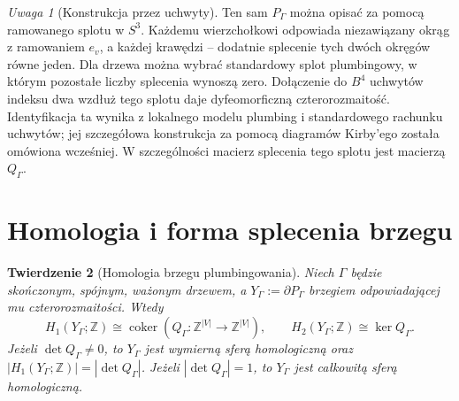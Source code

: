 \documentclass[11pt,a4paper]{report}
\numberwithin{equation}{section}
\theoremstyle{plain}
\newtheorem{twierdzenie}{Twierdzenie}[section]
\theoremstyle{definition}
\theoremstyle{remark}
\newtheorem{uwaga}[twierdzenie]{Uwaga}
\begin{document}
\begin{center}
\end{center}

\begin{uwaga}[Konstrukcja przez uchwyty]
Ten sam $P_\Gamma$ można opisać za pomocą ramowanego splotu
w $S^3$. Każdemu wierzchołkowi odpowiada niezawiązany okrąg
z ramowaniem $e_v$, a każdej krawędzi -- dodatnie splecenie
tych dwóch okręgów równe jeden. Dla drzewa można wybrać
standardowy splot plumbingowy, w którym pozostałe liczby
splecenia wynoszą zero. Dołączenie do $B^4$ uchwytów indeksu
dwa wzdłuż tego splotu daje dyfeomorficzną czterorozmaitość.
Identyfikacja ta wynika z lokalnego modelu plumbing i
standardowego rachunku uchwytów; jej szczegółowa konstrukcja
za pomocą diagramów Kirby'ego została omówiona wcześniej.
W szczególności macierz splecenia tego splotu jest macierzą
$Q_\Gamma$.
\end{uwaga}

\section{Homologia i forma splecenia brzegu}
\label{sec:tg-plumbing-boundary}

\begin{twierdzenie}[Homologia brzegu plumbingowania]
\label{thm:tg-plumbing-boundary}
Niech $\Gamma$ będzie skończonym, spójnym, ważonym drzewem,
a $Y_\Gamma:=\partial P_\Gamma$ brzegiem odpowiadającej
mu czterorozmaitości. Wtedy
\[
H_1(Y_\Gamma;\mathbb Z)\cong
\operatorname{coker}(Q_\Gamma:\mathbb Z^{|V|}\to\mathbb Z^{|V|}),
\qquad
H_2(Y_\Gamma;\mathbb Z)\cong\ker Q_\Gamma.
\]
Jeżeli $\det Q_\Gamma\ne0$, to $Y_\Gamma$ jest wymierną
sferą homologiczną oraz
$|H_1(Y_\Gamma;\mathbb Z)|=|\det Q_\Gamma|$.
Jeżeli $|\det Q_\Gamma|=1$, to $Y_\Gamma$ jest całkowitą
sferą homologiczną.
\end{twierdzenie}
\end{document}
